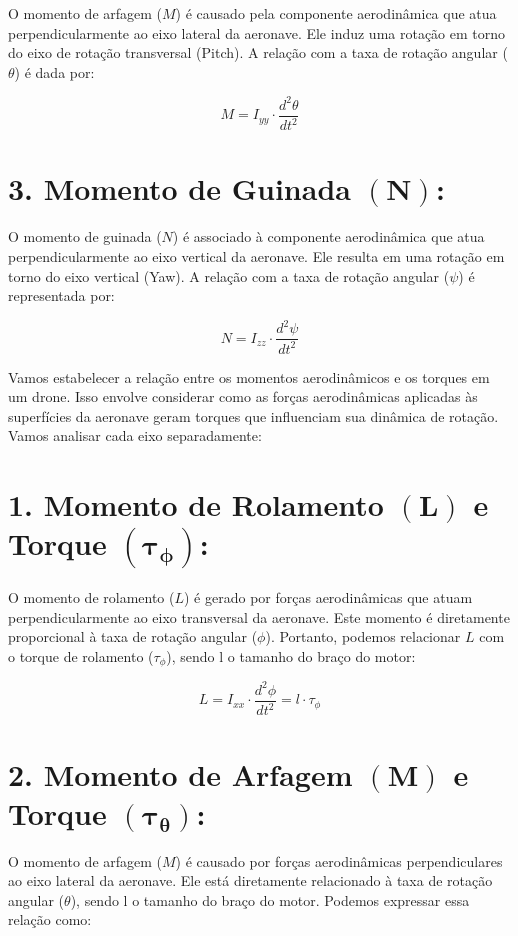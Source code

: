 O momento de arfagem (\(M\)) é causado pela componente aerodinâmica que atua perpendicularmente ao eixo lateral da aeronave. Ele induz uma rotação em torno do eixo de rotação transversal (Pitch). A relação com a taxa de rotação angular (\(\theta\)) é dada por:

\[
	M = I_{yy} \cdot \frac{d^2 \theta}{dt^2}
\]

\section*{3. Momento de Guinada $(\boldsymbol{N})$:}

O momento de guinada (\(N\)) é associado à componente aerodinâmica que atua perpendicularmente ao eixo vertical da aeronave. Ele resulta em uma rotação em torno do eixo vertical (Yaw). A relação com a taxa de rotação angular (\(\psi\)) é representada por:

\[
	N = I_{zz} \cdot \frac{d^2 \psi}{dt^2}
\]

Vamos estabelecer a relação entre os momentos aerodinâmicos e os torques em um drone. Isso envolve considerar como as forças aerodinâmicas aplicadas às superfícies da aeronave geram torques que influenciam sua dinâmica de rotação. Vamos analisar cada eixo separadamente:

\section*{1. Momento de Rolamento $(\boldsymbol{L})$ e Torque $(\boldsymbol{\tau_{\phi}})$:}

O momento de rolamento (\(L\)) é gerado por forças aerodinâmicas que atuam perpendicularmente ao eixo transversal da aeronave. Este momento é diretamente proporcional à taxa de rotação angular (\(\phi\)). Portanto, podemos relacionar \(L\) com o torque de rolamento (\(\tau_{\phi}\)), sendo l o tamanho do braço do motor:

\[
	L = I_{xx} \cdot \frac{d^2 \phi}{dt^2} = l \cdot \tau_{\phi}
\]

\section*{2. Momento de Arfagem $(\boldsymbol{M})$ e Torque $(\boldsymbol{\tau_{\theta}})$:}

O momento de arfagem (\(M\)) é causado por forças aerodinâmicas perpendiculares ao eixo lateral da aeronave. Ele está diretamente relacionado à taxa de rotação angular (\(\theta\)), sendo l o tamanho do braço do motor. Podemos expressar essa relação como:

